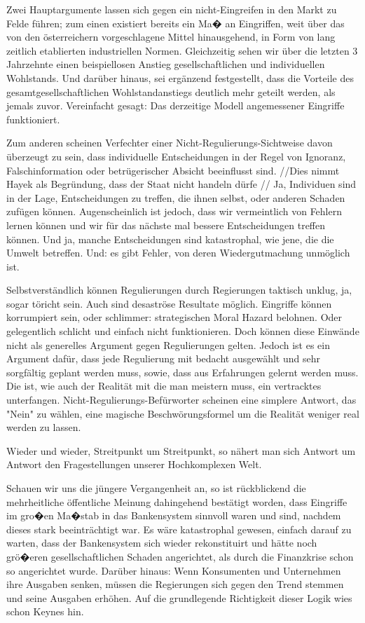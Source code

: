 \documentclass[
    onecolumn,
    a4paper,
    abstracton,
    parskip=half
    ,final
    ]{scrartcl}
\begin{document}
Zwei Hauptargumente lassen sich gegen ein nicht-Eingreifen in den Markt zu Felde f{\"u}hren; zum einen existiert bereits ein Ma� an Eingriffen, weit {\"u}ber das von den {\"o}sterreichern vorgeschlagene Mittel hinausgehend, in Form von lang zeitlich etablierten industriellen Normen. Gleichzeitig sehen wir {\"u}ber die letzten 3 Jahrzehnte einen beispiellosen Anstieg gesellschaftlichen und individuellen Wohlstands. Und dar{\"u}ber hinaus, sei erg{\"a}nzend festgestellt, dass die Vorteile des gesamtgesellschaftlichen Wohlstandanstiegs deutlich mehr geteilt werden, als jemals zuvor. Vereinfacht gesagt: Das derzeitige Modell angemessener Eingriffe funktioniert.

Zum anderen scheinen Verfechter einer Nicht-Regulierungs-Sichtweise davon {\"u}berzeugt zu sein, dass individuelle Entscheidungen in der Regel von Ignoranz, Falschinformation oder betr{\"u}gerischer Absicht beeinflusst sind. //Dies nimmt Hayek als Begr{\"u}ndung, dass der Staat nicht handeln d{\"u}rfe //
Ja, Individuen sind in der Lage, Entscheidungen zu treffen, die ihnen selbst, oder anderen Schaden zuf{\"u}gen k{\"o}nnen. Augenscheinlich ist jedoch, dass wir vermeintlich von Fehlern lernen k{\"o}nnen und wir f{\"u}r das n{\"a}chste mal bessere Entscheidungen treffen k{\"o}nnen. Und ja, manche Entscheidungen sind katastrophal, wie jene, die die Umwelt betreffen. Und: es gibt Fehler, von deren Wiedergutmachung unm{\"o}glich ist.

Selbstverst{\"a}ndlich k{\"o}nnen Regulierungen durch Regierungen taktisch unklug, ja, sogar t{\"o}richt sein. Auch sind desastr{\"o}se Resultate m{\"o}glich. Eingriffe k{\"o}nnen korrumpiert sein, oder schlimmer: strategischen Moral Hazard belohnen. Oder gelegentlich schlicht und einfach nicht funktionieren. Doch k{\"o}nnen diese Einw{\"a}nde nicht als generelles Argument gegen Regulierungen gelten. Jedoch ist es ein Argument daf{\"u}r, dass jede Regulierung mit bedacht ausgew{\"a}hlt und sehr sorgf{\"a}ltig geplant werden muss, sowie, dass aus Erfahrungen gelernt werden muss. Die ist, wie auch der Realit{\"a}t mit die man meistern muss, ein vertracktes unterfangen. Nicht-Regulierungs-Bef{\"u}rworter scheinen eine simplere Antwort, das "Nein" zu w{\"a}hlen, eine magische Beschw{\"o}rungsformel um die Realit{\"a}t weniger real werden zu lassen.

Wieder und wieder, Streitpunkt um Streitpunkt, so n{\"a}hert man sich Antwort um Antwort den Fragestellungen unserer Hochkomplexen Welt.

Schauen wir uns die j{\"u}ngere Vergangenheit an, so ist r{\"u}ckblickend die mehrheitliche {\"o}ffentliche Meinung dahingehend best{\"a}tigt worden, dass Eingriffe im gro�en Ma�stab in das Bankensystem sinnvoll waren und sind, nachdem dieses stark beeintr{\"a}chtigt war. Es w{\"a}re katastrophal gewesen, einfach darauf zu warten, dass der Bankensystem sich wieder rekonstituirt und h{\"a}tte noch gr{\"o}�eren gesellschaftlichen Schaden angerichtet, als durch die Finanzkrise schon so angerichtet wurde. Dar{\"u}ber hinaus: Wenn Konsumenten und Unternehmen ihre Ausgaben senken, m{\"u}ssen die Regierungen sich gegen den Trend stemmen und seine Ausgaben erh{\"o}hen. Auf die grundlegende Richtigkeit dieser Logik wies schon Keynes hin.
\end{document}
